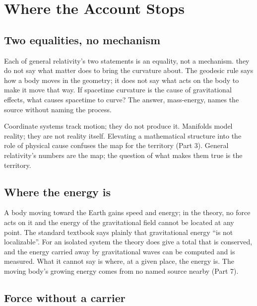 \documentclass[11pt,a4paper]{article}
\begin{document}
\section{Where the Account Stops}

\subsection{Two equalities, no mechanism}

Each of general relativity's two statements is an equality, not a mechanism.  they do not say what matter does to bring the curvature about. The geodesic rule says how a body moves in the geometry; it does not say what acts on the body to make it move that way. If spacetime curvature is the cause of gravitational effects, what causes spacetime to curve? The answer, mass-energy, names the source without naming the process.

 Coordinate systems track motion; they do not produce it. Manifolds model reality; they are not reality itself. Elevating a mathematical structure into the role of physical cause confuses the map for the territory (Part 3). General relativity's numbers are the map; the question of what makes them true is the territory.

\subsection{Where the energy is}

 A body moving toward the Earth gains speed and energy; in the theory, no force acts on it and the energy of the gravitational field cannot be located at any point. The standard textbook says plainly that gravitational energy ``is not localizable''. For an isolated system the theory does give a total that is conserved, and the energy carried away by gravitational waves can be computed and is measured. What it cannot say is where, at a given place, the energy is. The moving body's growing energy comes from no named source nearby (Part 7).

\subsection{Force without a carrier}
\end{document}
